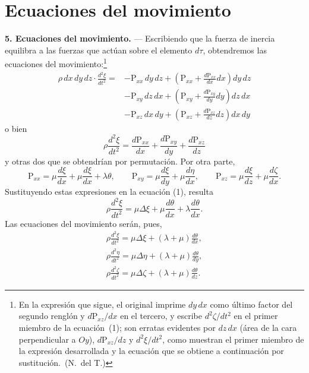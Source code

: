 \section{Ecuaciones del movimiento}

\noindent\textbf{5. Ecuaciones del movimiento.} — Escribiendo que la
fuerza de inercia equilibra a las fuerzas que actúan sobre el elemento
$d\tau$, obtendremos las ecuaciones del movimiento:\footnote{En la
expresión que sigue, el original imprime $dy\,dx$ como último factor del
segundo renglón y $d\mathrm{P}_{xz}/dx$ en el tercero, y escribe
$d^2\zeta/dt^2$ en el primer miembro de la ecuación~(1); son
erratas evidentes por $dz\,dx$ (área de la cara perpendicular a $Oy$),
$d\mathrm{P}_{xz}/dz$ y $d^2\xi/dt^2$, como muestran el
primer miembro de la expresión desarrollada y la ecuación que se obtiene a
continuación por sustitución.~(N.~del T.)}
\[
\begin{aligned}
\rho\,dx\,dy\,dz\cdot\frac{d^2\xi}{dt^2}
={}&-\mathrm{P}_{xx}\,dy\,dz+\left(\mathrm{P}_{xx}+\frac{d\mathrm{P}_{xx}}{dx}dx\right)dy\,dz\\
&-\mathrm{P}_{xy}\,dz\,dx+\left(\mathrm{P}_{xy}+\frac{d\mathrm{P}_{xy}}{dy}dy\right)dz\,dx\\
&-\mathrm{P}_{xz}\,dx\,dy+\left(\mathrm{P}_{xz}+\frac{d\mathrm{P}_{xz}}{dz}dz\right)dx\,dy
\end{aligned}
\]
o bien
\begin{equation}
\rho\frac{d^2\xi}{dt^2}=\frac{d\mathrm{P}_{xx}}{dx}+\frac{d\mathrm{P}_{xy}}{dy}+\frac{d\mathrm{P}_{xz}}{dz}
\tag{1}
\end{equation}
y otras dos que se obtendrían por permutación. Por otra parte,
\[
\mathrm{P}_{xx}=\mu\frac{d\xi}{dx}+\mu\frac{d\xi}{dx}+\lambda\theta,\qquad
\mathrm{P}_{xy}=\mu\frac{d\xi}{dy}+\mu\frac{d\eta}{dx},\qquad
\mathrm{P}_{xz}=\mu\frac{d\xi}{dz}+\mu\frac{d\zeta}{dx}.
\]
Sustituyendo estas expresiones en la ecuación (1), resulta
\[
\rho\frac{d^2\xi}{dt^2}=\mu\Delta\xi+\mu\frac{d\theta}{dx}+\lambda\frac{d\theta}{dx}.
\]
Las ecuaciones del movimiento serán, pues,
\begin{equation}
\begin{gathered}
\rho\frac{d^2\xi}{dt^2}=\mu\Delta\xi+(\lambda+\mu)\frac{d\theta}{dx},\\[3pt]
\rho\frac{d^2\eta}{dt^2}=\mu\Delta\eta+(\lambda+\mu)\frac{d\theta}{dy},\\[3pt]
\rho\frac{d^2\zeta}{dt^2}=\mu\Delta\zeta+(\lambda+\mu)\frac{d\theta}{dz}.
\end{gathered}
\tag{I}
\end{equation}

